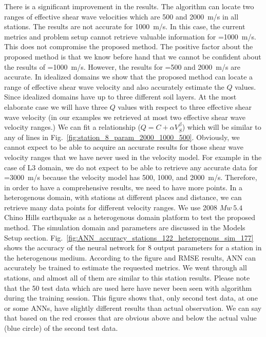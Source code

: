There is a significant improvement in the results. The algorithm can locate two ranges of effective shear wave velocities which are 500 and 2000~m/s in all stations. The results are not accurate for 1000~m/s. In this case, the current metrics and problem setup cannot retrieve valuable information for \vs{}=1000~m/s. This does not compromise the proposed method. The positive factor about the proposed method is that we know before hand that we cannot be confident about the results of \vs{}=1000~m/s. However, the results for \vs{}=500 and 2000~m/s are accurate. 
In idealized domains we show that the proposed method can locate a range of effective shear wave velocity and also accurately estimate the $Q$ values. Since idealized domains have up to three different soil layers. At the most elaborate case we will have three $Q$ values with respect to three effective shear wave velocity (in our examples we retrieved at most two effective shear wave velocity ranges.) We can fit a \qsvs{} relationship ($Q=C+\alpha V_{S}^\beta$) which will be similar to any of lines in Fig.~\ref{fig:station_8_param_2000_1000_500}. Obviously, we cannot expect to be able to acquire an accurate results for those shear wave velocity ranges that we have never used in the velocity model. For example in the case of L3 domain, we do not expect to be able to retrieve any accurate data for \vs{}=3000~m/s because the velocity model has 500, 1000, and 2000~m/s.  Therefore, in order to have a comprehensive results, we need to have more \qsvs{} points. In a heterogenous domain, with stations at different places and distance, we can retrieve many data points for different velocity ranges.
We use 2008  $Mw~5.4$ Chino Hills earthquake as a heterogenous domain platform to test the proposed method. The simulation domain and parameters are discussed in the Models Setup section. Fig.~\ref{fig:ANN_accuracy_stations_122_heterogenous_sim_177} shows the accuracy of the neural network for 8 output parameters for a station in the heterogenous medium. According to the figure and RMSE results, ANN can accurately be trained to estimate the requested metrics. We went through all stations, and almost all of them are similar to this station results. Please note that the 50 test data which are used here have never been seen with algorithm during the training session. This figure shows that, only second test data, at one or some ANNs, have slightly different results than actual observation. We can say that based on the red crosses that are obvious above and below the actual value (blue circle) of the second test data.   

